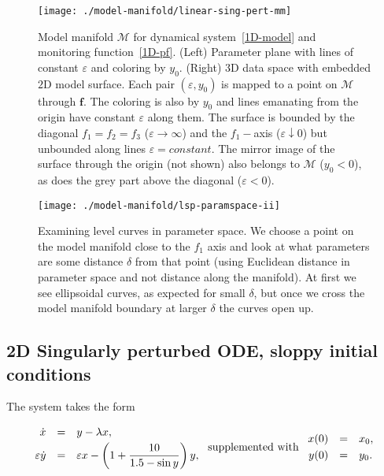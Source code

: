 \documentclass[11pt]{article}
\newcommand{\eps}{\varepsilon}
\newcommand{\be}{\begin{equation}}
\newcommand{\ee}{\end{equation}}
\begin{document}
\begin{figure}[htbp]
  \centering
  \texttt{[image: ./model-manifold/linear-sing-pert-mm]}
  \caption{Model manifold $\mathcal{M}$ for dynamical system~\eqref{1D-model} and monitoring function~\eqref{1D-pf}.
(Left) Parameter plane with lines of constant $\eps$ and coloring by $y_0$.
(Right) $3$D data space with embedded $2$D model surface.
Each pair $(\eps,y_0)$ is mapped to a point on $\mathcal{M}$ through $\mathbf{f}$.
The coloring is also by $y_0$ and lines emanating from the origin have constant $\eps$ along them.
The surface is bounded by the diagonal $f_1=f_2=f_3$ ($\eps\to\infty$)
and the $f_1-$axis ($\eps\downarrow0$) but unbounded along lines
$\eps=constant$. The mirror image of the surface through the origin (not shown) also
belongs to $\mathcal{M}$ ($y_0<0$), as does the grey part above the
diagonal ($\eps<0$). \label{fig:lmm}}
\end{figure}

\begin{figure}
  \centering
  \texttt{[image: ./model-manifold/lsp-paramspace-ii]}
  \caption{Examining level curves in parameter space. We choose a
    point on the model manifold close to the $f_1$ axis and look at
    what parameters are some distance $\delta$ from that point (using
    Euclidean distance in parameter space and not distance along the
    manifold). At first we see ellipsoidal curves, as expected for
    small $\delta$, but once we cross the model manifold boundary
    at larger $\delta$ the curves open up. \label{fig:lmm-lc} }
\end{figure}


\subsection{2D Singularly perturbed ODE, sloppy initial conditions}

The system takes the form

\be
\begin{array}{rcl}
 \dot{x} &=& y - \lambda x ,
\vspace*{1mm}\\
 \eps \dot{y} &=& \eps x - \displaystyle\left(1+\frac{10}{1.5-\sin y}\right) y ,
\end{array}
\ \mbox{supplemented with} \
\begin{array}{rcl}
 x(0) &=& x_0 ,
\vspace*{1mm}\\
 y(0) &=& y_0 .
\end{array}
\label{elem-ODE}
\ee
\end{document}
